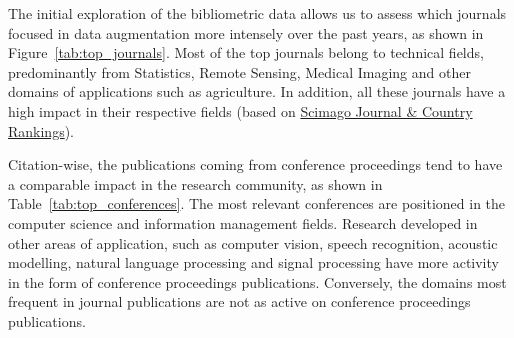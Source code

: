 \documentclass[parskip=full]{scrartcl}
\begin{document}
The initial exploration of the bibliometric data allows us to assess which
journals focused in data augmentation more intensely over the past years, as
shown in Figure~\ref{tab:top_journals}. Most of the top journals belong to
technical fields, predominantly from Statistics, Remote Sensing, Medical
Imaging and other domains of applications such as agriculture. In addition,
all these journals have a high impact in their respective fields (based on 
\href{https://www.scimagojr.com/}{Scimago Journal \& Country Rankings}).   

\begin{table}[H]
    \centering
    \vspace{.2cm}
    \caption{\label{tab:top_journals}
        Top journals focusing on data augmentation techniques, sorted by
        citations per document.
    }
\end{table}

Citation-wise, the publications coming from conference proceedings tend to
have a comparable impact in the research community, as shown in
Table~\ref{tab:top_conferences}. The most relevant conferences are positioned
in the computer science and information management fields. Research developed
in other areas of application, such as computer vision, speech recognition,
acoustic modelling, natural language processing and signal processing have
more activity in the form of conference proceedings publications. Conversely,
the domains most frequent in journal publications are not as active on
conference proceedings publications.

\begin{table}[H]
    \centering
    \vspace{.2cm}
    \caption{\label{tab:top_conferences}
        Top conferences focusing on data augmentation techniques, sorted by
        citations per document.
    }
\end{table}
\end{document}
